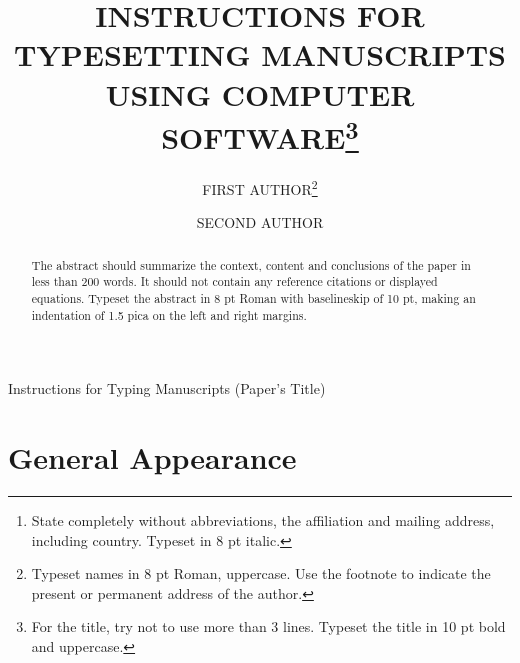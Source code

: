 \documentclass{ws-ijseke}
\begin{document}
{Instructions for Typing Manuscripts (Paper's Title)}

%
\catchline{}{}{}{}{}
%

\title{INSTRUCTIONS FOR TYPESETTING MANUSCRIPTS \\
USING COMPUTER SOFTWARE\footnote{For the title, try not to 
use more than 3 lines. Typeset the title in 10 pt bold and uppercase.}}

\author{FIRST AUTHOR\footnote{
Typeset names in 8 pt Roman, uppercase. Use the footnote to indicate the
present or permanent address of the author.}}

\address{University Department, University Name, Address\\
City, State ZIP/Zone,Country\,\footnote{State completely without 
abbreviations, the affiliation and mailing address, 
including country. Typeset in 8 pt italic.}\\
}

\author{SECOND AUTHOR}

\address{Group, Laboratory, Address\\
City, State ZIP/Zone, Country\\
author\_id@domain\_name
}

\maketitle

\begin{history}
\end{history}

\begin{abstract}
The abstract should summarize the context, content and conclusions of
the paper in less than 200 words. It should not contain any reference
citations or displayed equations. Typeset the abstract in 8 pt Roman
with baselineskip of 10 pt, making an indentation of 1.5 pica on the
left and right margins.
\end{abstract}


\section{General Appearance \label{ga}}	%
\end{document}
